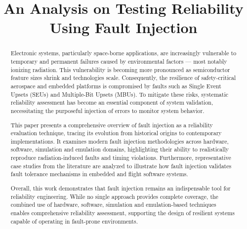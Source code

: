 \documentclass[conference, 12pt]{IEEEtran}
\title{An Analysis on Testing Reliability Using Fault Injection }
\author{
    \IEEEauthorblockN{Vasileios Zoidis, Savvas Tzanetis}
    \IEEEauthorblockA{
        Department of Electrical and Computer Engineering\\
        Aristotle University of Thessaloniki
    }
}
\begin{document}
\maketitle

\begin{abstract}
Electronic systems, particularly space-borne applications, are increasingly vulnerable to temporary and permanent failures caused by environmental factors — most notably ionizing radiation. This vulnerability is becoming more pronounced as semiconductor feature sizes shrink and technologies scale. Consequently, the resilience of safety-critical aerospace and embedded platforms is compromised by faults such as Single Event Upsets (SEUs) and Multiple-Bit Upsets (MBUs). To mitigate these risks, systematic reliability assessment has become an essential component of system validation, necessitating the purposeful injection of errors to monitor system behavior.

This paper presents a comprehensive overview of fault injection as a reliability evaluation technique, tracing its evolution from historical origins to contemporary implementations. It examines modern fault injection methodologies across hardware, software, simulation and emulation domains, highlighting their ability to realistically reproduce radiation-induced faults and timing violations. Furthermore, representative case studies from the literature are analyzed to illustrate how fault injection validates fault tolerance mechanisms in embedded and flight software systems.

Overall, this work demonstrates that fault injection remains an indispensable tool for reliability engineering. While no single approach provides complete coverage, the combined use of hardware, software, simulation and emulation-based techniques enables comprehensive reliability assessment, supporting the design of resilient systems capable of operating in fault-prone environments.
\end{abstract}















\end{document}
